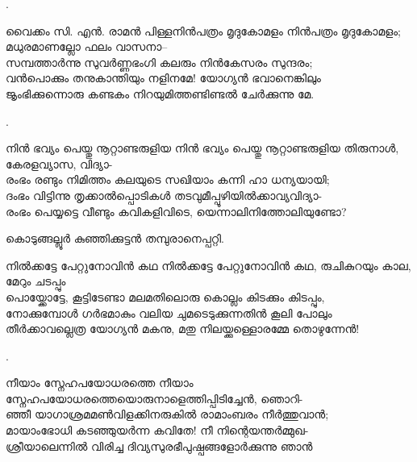 \begin{enumerate}
.

\begin{slokam}{\VSv}{വൈക്കം സി. എൻ. രാമൻ പിള്ള}{നിൻപത്രം മൃദുകോമളം}
നിൻപത്രം മൃദുകോമളം; മധുരമാണല്ലോ ഫലം വാസനാ–\\
സമ്പത്താർന്നു സുവർണ്ണഭംഗി കലരും നിൻകേസരം സുന്ദരം;\\
വൻപൊക്കും തനുകാന്തിയും നളിനമേ! യോഗ്യൻ ഭവാനെങ്കിലും\\
ജൃംഭിക്കുന്നൊരു കണ്ടകം നിറയുമിത്തണ്ടിണ്ടൽ ചേർക്കുന്നു മേ.
\end{slokam}


.


\begin{slokam}{\VSr}{\Vyl}{നിൻ ഭവ്യം പെയ്തു നൂറ്റാണ്ടരുളിയ}
നിൻ ഭവ്യം പെയ്തു നൂറ്റാണ്ടരുളിയ തിരുനാൾ,  കേരളവ്യാസ, വിദ്യാ- \\
രംഭം രണ്ടും നിമിത്തം കലയുടെ സഖിയാം കന്നി ഹാ ധന്യയായി;\\
ദംഭം വിട്ടിന്നു തൃക്കാൽപ്പൊടികൾ തടവുമീപ്പൂഴിയിൽക്കാവ്യവിദ്യാ-\\
രംഭം പെയ്യട്ടെ വീണ്ടും കവികളിവിടെ, യെന്നാലിനിത്തോലിയുണ്ടോ?
\end{slokam}


കൊടുങ്ങല്ലൂർ കുഞ്ഞിക്കുട്ടൻ തമ്പുരാനെപ്പറ്റി. 


\begin{slokam}{\VSr}{\KKT}{നിൽക്കട്ടേ പേറ്റുനോവിൻ കഥ}
നിൽക്കട്ടേ പേറ്റുനോവിൻ കഥ, രുചികുറയും കാല, മേറും ചടപ്പും\\
പൊയ്ക്കോട്ടേ, കൂട്ടിടേണ്ടാ മലമതിലൊരു കൊല്ലം കിടക്കും കിടപ്പും,\\
നോക്കുമ്പോള്‍ ഗർഭമാകും വലിയ ചുമടെടുക്കുന്നതിൻ കൂലി പോലും\\
തീർക്കാവല്ലെത്ര യോഗ്യൻ മകനു, മതു നിലയ്ക്കുള്ളൊരമ്മേ തൊഴുന്നേൻ!
\end{slokam}


.


\begin{slokam}{\VSv}{\VRV}{നീയാം സ്നേഹപയോധരത്തെ}
നീയാം സ്നേഹപയോധരത്തെയൊരുനാളെത്തിപ്പിടിച്ചേൻ, ഞൊറി-\\
ഞ്ഞീ യാഗാശ്രമമൺവിളക്കിനരുകിൽ രാമാംബരം നീർത്തുവാൻ;\\
മായാംഭോധി കടഞ്ഞുയർന്ന കവിതേ! നീ നിന്റെയന്തർമ്മുഖ-\\
ശ്രീയാലെന്നിൽ വിരിച്ച ദിവ്യസുരഭീപുഷ്പങ്ങളോർക്കുന്നു ഞാൻ
\end{slokam}


\end{enumerate}
